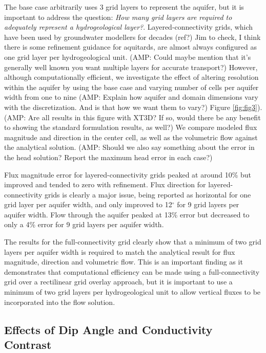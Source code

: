\documentclass{article}
\begin{document}
The base case arbitrarily uses 3 grid layers to represent the aquifer, but it is important to address the question: \emph{How many grid layers are required to adequately represent a hydrogeological layer?}. Layered-connectivity grids, which have been used by groundwater modellers for decades (ref?) {\color{red} Jim to check, I think there is some refinement guidance for aquitards}, are almost always configured as one grid layer per hydrogeological unit. {\color{red} (AMP: Could maybe mention that it's generally well known you want multiple layers for accurate transport?)} However, although computationally efficient, we investigate the effect of altering resolution within the aquifer by using the base case and varying number of cells per aquifer width from one to nine {\color{red} (AMP: Explain how aquifer and domain dimensions vary with the discretization. And is that how we want them to vary?)} Figure \ref{fig:fig3}). {\color{red} (AMP: Are all results in this figure with XT3D? If so, would there be any benefit to showing the standard formulation results, as well?)} We compare modeled flux magnitude and direction in the center cell, as well as the volumetric flow against the analytical solution. {\color{red} (AMP: Should we also say something about the error in the head solution? Report the maximum head error in each case?)}

Flux magnitude error for layered-connectivity grids peaked at around 10\% but improved and tended to zero with refinement. Flux direction for layered-connectivity grids is clearly a major issue, being reported as horizontal for one grid layer per aquifer width, and only improved to 12$^{\circ}$ for 9 grid layers per aquifer width. Flow through the aquifer peaked at 13\% error but decreased to only a 4\% error for 9 grid layers per aquifer width.

The results for the full-connectivity grid clearly show that a minimum of two grid layers per aquifer width is required to match the analytical result for flux magnitude, direction and volumetric flow. This is an important finding as it demonstrates that computational efficiency can be made using a full-connectivity grid over a rectilinear grid overlay approach, but it is important to use a minimum of two grid layers per hydrogeological unit to allow vertical fluxes to be incorporated into the flow solution. 

\subsection{Effects of Dip Angle and Conductivity Contrast}
\end{document}
